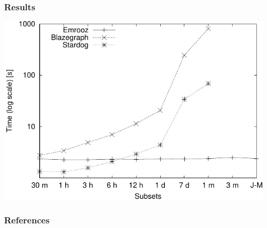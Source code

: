 \documentclass{beamer}
\begin{document}
\begin{frame}
  \frametitle{Results}
  
  \centering
	\includegraphics[scale=0.8]{query-performance-plot.pdf}
  
\end{frame}

\begin{frame}
  \frametitle{References}
  
  \tiny
   
  
  
\end{frame}
\end{document}
